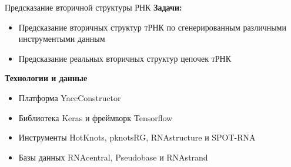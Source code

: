 \documentclass{beamer}
\begin{document}
\begin{frame}{Предсказание вторичной структуры РНК}
\textbf{Задачи:}  
\begin{itemize}
    \item Предсказание вторичных структур тРНК по сгенерированным различными инструментыми данным
    \item Предсказание реальных вторичных структур цепочек тРНК
\end{itemize} 

\vspace{6mm}

\textbf{Технологии и данные}
\begin{itemize}
    \item Платформа YaccConstructor
    \item Библиотека Keras и фреймворк Tensorflow
    \item Инструменты HotKnots, pknotsRG, RNAstructure и SPOT-RNA
    \item Базы данных RNAcentral, Pseudobase и RNAstrand 
\end{itemize}

\vspace{6mm}

\end{frame}
\end{document}

